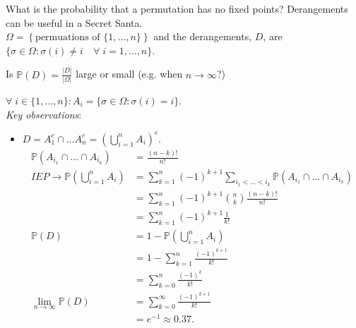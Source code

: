 \begin{example}[Derangements]
    What is the probability that a permutation has no fixed points? Derangements can be useful in a Secret Santa. \\
    $\Omega = \left\{\text{permuations of } \{1, \dots, n\} \right\}$ and the derangements, $D$, are $\{\sigma \in \Omega : \sigma(i) \neq i \quad \forall \; i = 1, \dots, n\}$.
    \begin{question}
        Is $\mathbb{P}(D) = \frac{|D|}{|\Omega|}$ large or small (e.g. when $n \to \infty$?)
    \end{question} 
    $\forall \; i \in \{1, \dots, n\} : A_i = \{\sigma \in \Omega : \sigma(i) = i\}$. \\
    \emph{Key observations}:
    \begin{itemize}
        \item $D = A_1^c \cap \dots A_n^c = \left(\bigcup_{i = 1}^n A_i \right)^c.$
        \mathitem
        \begin{align*}
            \mathbb{P}(A_{i_1} \cap \dots \cap A_{i_k}) &= \frac{(n - k)!}{n!} \\
            IEP \to \mathbb{P}\left(\bigcup_{i = 1}^n A_i \right) &= \sum_{k=1}^{n} (-1)^{k + 1} \sum_{i_1 < \dots < i_k} \mathbb{P}(A_{i_1} \cap \dots \cap A_{i_k}) \\
            &= \sum_{k=1}^{n} (-1)^{k+1} \binom{n}{k} \frac{(n - k)!}{n!} \\
            &= \sum_{k=1}^{n} (-1)^{k+1} \frac{1}{k!} \\
            \mathbb{P}(D) &= 1 - \mathbb{P}\left(\bigcup_{i = 1}^n A_i \right) \\
            &= 1 - \sum_{k=1}^{n} \frac{(-1)^{k+1}}{k!} \\
            &= \sum_{k=0}^{n} \frac{(-1)^{k}}{k!} \\
            \lim_{n \to \infty} \mathbb{P}(D) &= \sum_{k=0}^{\infty} \frac{(-1)^{k+1}}{k!} \\
            &= e^{-1} \approx 0.37.
        \end{align*} 
    \end{itemize}


\end{example}

